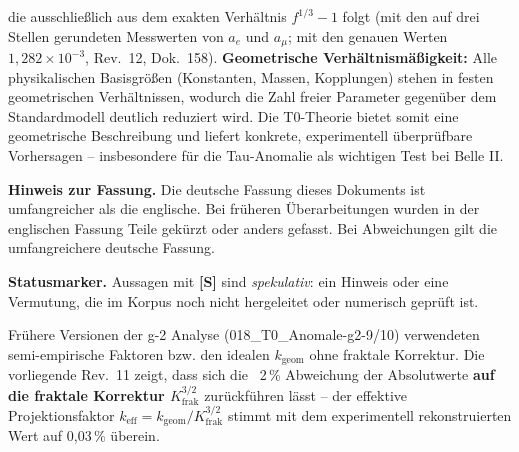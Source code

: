 		die ausschließlich aus dem exakten Verhältnis $f^{1/3} - 1$ folgt (mit den auf drei Stellen gerundeten Messwerten von $a_e$ und $a_\mu$; mit den genauen Werten $1{,}282 \times 10^{-3}$, Rev.~12, Dok.~158).
		\textbf{Geometrische Verhältnismäßigkeit:} Alle physikalischen Basisgrößen (Konstanten, Massen, Kopplungen) stehen in festen geometrischen Verhältnissen, wodurch die Zahl freier Parameter gegenüber dem Standardmodell deutlich reduziert wird. Die T0-Theorie bietet somit eine geometrische Beschreibung und liefert konkrete, experimentell überprüfbare Vorhersagen – insbesondere für die Tau-Anomalie als wichtigen Test bei Belle II.

	\medskip\noindent\textbf{Hinweis zur Fassung.} Die deutsche Fassung dieses Dokuments ist umfangreicher als die englische. Bei früheren Überarbeitungen wurden in der englischen Fassung Teile gekürzt oder anders gefasst. Bei Abweichungen gilt die umfangreichere deutsche Fassung.


	\medskip\noindent\textbf{Statusmarker.} Aussagen mit \textbf{[S]} sind \emph{spekulativ}: ein Hinweis oder eine Vermutung, die im Korpus noch nicht hergeleitet oder numerisch geprüft ist.


	
	\begin{tcolorbox}[colback=yellow!10!white, colframe=orange!75!black, title=Hinweis zu älteren Dokumenten]
		Frühere Versionen der g-2 Analyse (018\_T0\_Anomale-g2-9/10) verwendeten semi-empirische Faktoren bzw. den idealen $k_\text{geom}$ ohne fraktale Korrektur. Die vorliegende Rev.~11 zeigt, dass sich die ~2\,\% Abweichung der Absolutwerte \textbf{auf die fraktale Korrektur $K_\text{frak}^{3/2}$} zurückführen lässt – der effektive Projektionsfaktor $k_\text{eff} = k_\text{geom}/K_\text{frak}^{3/2}$ stimmt mit dem experimentell rekonstruierten Wert auf 0{,}03\,\% überein.
	\end{tcolorbox}
	
